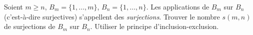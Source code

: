 Soient $m \geq n$, $B_m = \{1, \ldots, m\}$, $B_n = \{1, \ldots, n\}$. Les applications de $B_m$ sur $B_n$ (c'est-à-dire surjectives) s'appellent des \emph{surjections}. Trouver le nombre $s(m, n)$ de surjections de $B_m$ sur $B_n$. Utiliser le principe d'inclusion-exclusion.
